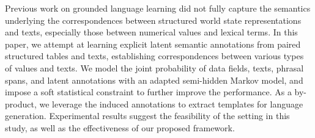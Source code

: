 Previous work on grounded language learning did not fully capture the semantics underlying the correspondences between structured world state representations and texts, especially those between numerical values and lexical terms. In this paper, we attempt at learning explicit latent semantic annotations from paired structured tables and texts, establishing correspondences between various types of values and texts. We model the joint probability of data fields, texts, phrasal spans, and latent annotations with an adapted semi-hidden Markov model, and impose a soft statistical constraint to further improve the performance. As a by-product, we leverage the induced annotations to extract templates for language generation. Experimental results suggest the feasibility of the setting in this study, as well as the effectiveness of our proposed framework.
